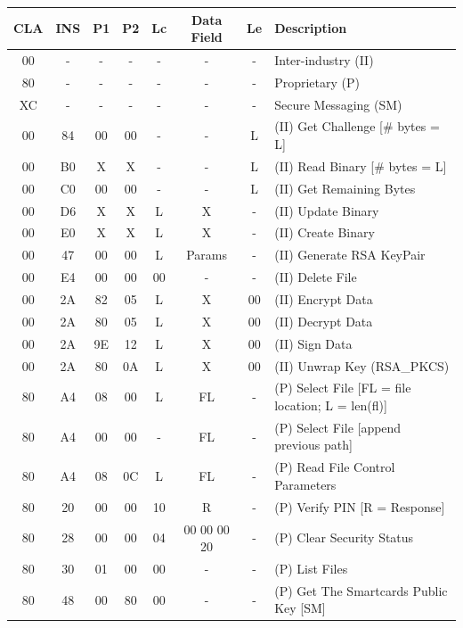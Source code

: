 \documentclass[bsc,frontabs,twoside,singlespacing,parskip,deptreport]{infthesis}     %
\begin{document}
\begin{table}[H]
\hskip-1.0cm\begin{tabular}{|c|c|c|c|c|c|c|p{8cm}|}
\hline
CLA & INS & P1 & P2 & Lc  & Data Field & Le & Description\\
\hline
00  & -   & -  & -  & -   & -          & -  & Inter-industry (II)\\
80  & -   & -  & -  & -   & -          & -  & Proprietary (P)\\
XC  & -   & -  & -  & -   & -          & -  & Secure Messaging (SM)\\
\hline
00  & 84  & 00 & 00 & -   & -          & L  &  (II) Get Challenge [\# bytes = L]\\
00  & B0  & X  & X  & -   & -          & L  &  (II) Read Binary [\# bytes = L] \\
00  & C0  & 00 & 00 & -   & -          & L  &  (II) Get Remaining Bytes\\
00  & D6  & X  & X  & L   & X          & -  &  (II) Update Binary\\
00  & E0  & X  & X  & L   & X          & -  &  (II) Create Binary\\
00  & 47  & 00 & 00 & L   & Params     & -  &  (II) Generate RSA KeyPair\\
00  & E4  & 00 & 00 & 00  & -          & -  &  (II) Delete File\\
00  & 2A  & 82 & 05 & L   & X          & 00 &  (II) Encrypt Data \\
00  & 2A  & 80 & 05 & L   & X          & 00 &  (II) Decrypt Data \\
00  & 2A  & 9E & 12 & L   & X          & 00 &  (II) Sign Data \\
00  & 2A  & 80 & 0A & L   & X          & 00  & (II) Unwrap Key (RSA\_PKCS)\\
\hline
80  & A4  & 08 & 00 & L   & FL         & -  & (P) Select File [FL = file location; L = len(fl)]\\
80  & A4  & 00 & 00 & -   & FL         & -  & (P) Select File [append previous path]\\
80  & A4  & 08 & 0C & L   & FL         & -  & (P) Read File Control Parameters\\
80  & 20  & 00 & 00 & 10  & R          & -  & (P) Verify PIN [R = Response]\\
80  & 28  & 00 & 00 & 04  & 00 00 00 20& -  & (P) Clear Security Status\\
80  & 30  & 01 & 00 & 00  & -          & -  & (P) List Files\\
80  & 48  & 00 & 80 & 00  & -          & -  & (P) Get The Smartcards Public Key [SM]\\

\end{tabular}
\end{table}
\end{document}
